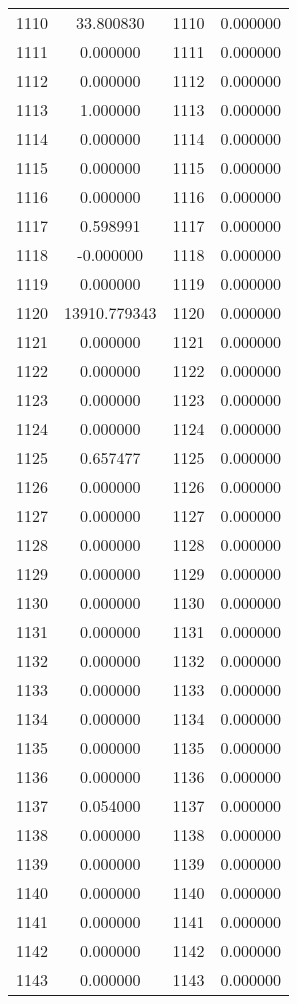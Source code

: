 \documentclass[12pt]{article}
\begin{document}
\begin{longtable}{@{}cccc@{}}
1110 & 33.800830 & 1110 & 0.000000 \\
1111 & 0.000000 & 1111 & 0.000000 \\
1112 & 0.000000 & 1112 & 0.000000 \\
1113 & 1.000000 & 1113 & 0.000000 \\
1114 & 0.000000 & 1114 & 0.000000 \\
1115 & 0.000000 & 1115 & 0.000000 \\
1116 & 0.000000 & 1116 & 0.000000 \\
1117 & 0.598991 & 1117 & 0.000000 \\
1118 & -0.000000 & 1118 & 0.000000 \\
1119 & 0.000000 & 1119 & 0.000000 \\
1120 & 13910.779343 & 1120 & 0.000000 \\
1121 & 0.000000 & 1121 & 0.000000 \\
1122 & 0.000000 & 1122 & 0.000000 \\
1123 & 0.000000 & 1123 & 0.000000 \\
1124 & 0.000000 & 1124 & 0.000000 \\
1125 & 0.657477 & 1125 & 0.000000 \\
1126 & 0.000000 & 1126 & 0.000000 \\
1127 & 0.000000 & 1127 & 0.000000 \\
1128 & 0.000000 & 1128 & 0.000000 \\
1129 & 0.000000 & 1129 & 0.000000 \\
1130 & 0.000000 & 1130 & 0.000000 \\
1131 & 0.000000 & 1131 & 0.000000 \\
1132 & 0.000000 & 1132 & 0.000000 \\
1133 & 0.000000 & 1133 & 0.000000 \\
1134 & 0.000000 & 1134 & 0.000000 \\
1135 & 0.000000 & 1135 & 0.000000 \\
1136 & 0.000000 & 1136 & 0.000000 \\
1137 & 0.054000 & 1137 & 0.000000 \\
1138 & 0.000000 & 1138 & 0.000000 \\
1139 & 0.000000 & 1139 & 0.000000 \\
1140 & 0.000000 & 1140 & 0.000000 \\
1141 & 0.000000 & 1141 & 0.000000 \\
1142 & 0.000000 & 1142 & 0.000000 \\
1143 & 0.000000 & 1143 & 0.000000 \\

\end{longtable}
\end{document}
